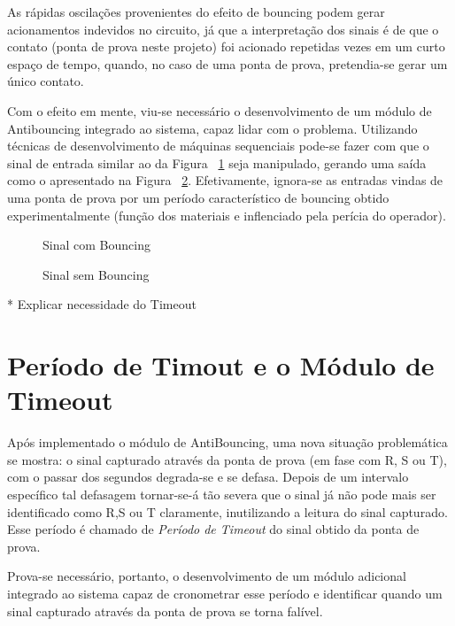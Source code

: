 \documentclass[12pt,a4paper,openany]{abntex2}
\begin{document}
As rápidas oscilações provenientes do efeito de bouncing podem
gerar acionamentos indevidos no circuito, já que a interpretação dos sinais é de que o contato (ponta de prova neste projeto) foi acionado repetidas vezes em um curto espaço de tempo, quando, no caso de uma ponta de prova, pretendia-se gerar um único contato.

Com o efeito em mente, viu-se necessário o desenvolvimento de um módulo de Antibouncing integrado ao sistema, capaz lidar com o problema. Utilizando técnicas de desenvolvimento de máquinas sequenciais pode-se fazer com que o sinal de entrada similar ao da Figura ~\ref{fig:sinal-com-bouncing} seja manipulado, gerando uma saída como o apresentado na Figura ~\ref{fig:sinal-sem-bouncing}. Efetivamente, ignora-se as entradas vindas de uma ponta de prova por um período característico de bouncing obtido experimentalmente (função dos materiais e inflenciado pela perícia do operador).

\begin{figure}[!htp]
	\centering
	\caption{Sinal com Bouncing}
	\label{fig:sinal-com-bouncing}
\end{figure}

\begin{figure}[!htp]
	\centering
	\caption{Sinal sem Bouncing}
	\label{fig:sinal-sem-bouncing}
\end{figure}

* Explicar necessidade do Timeout
\section{Período de Timout e o Módulo de Timeout}

Após implementado o módulo de AntiBouncing, uma nova situação problemática se mostra: o sinal capturado através da ponta de prova (em fase com R, S ou T), com o passar dos segundos degrada-se e se defasa. Depois de um intervalo específico tal defasagem tornar-se-á
tão severa que o sinal já não pode mais ser identificado como R,S ou T claramente, inutilizando a leitura do sinal capturado. Esse período é chamado de \textit{Período de Timeout} do sinal obtido da ponta de prova.

Prova-se necessário, portanto, o desenvolvimento de um módulo adicional integrado ao sistema capaz de cronometrar esse período e identificar quando um sinal capturado através da ponta de prova se torna falível.
\end{document}
